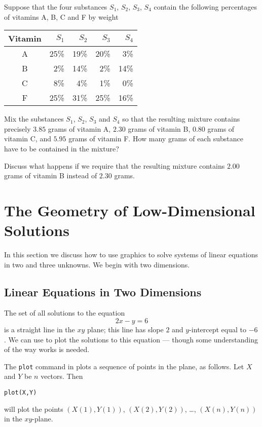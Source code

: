 \documentclass{ximera}
\begin{document}
\begin{exercise} \label{c2.1.7}
Suppose that the four substances $S_1$, $S_2$, $S_3$, $S_4$
contain the following percentages of vitamins A, B, C and F by
weight
\begin{center}
\begin{tabular}{|c||r|r|r|r|}
\hline
Vitamin   & $S_1$ & $S_2$ & $S_3$ & $S_4$\\
\hline
 A & 25\% &    19\% &    20\% &    3\% \\
 B &  2\% &    14\% &     2\% &   14\% \\
 C &  8\% &     4\% &     1\% &     0\% \\
 F & 25\% &    31\% &    25\% &    16\% \\
\hline
\end{tabular}
\end{center}
Mix the substances $S_1$, $S_2$, $S_3$ and $S_4$ so that the
resulting mixture contains precisely $3.85$ grams of vitamin A,
$2.30$ grams of vitamin B, $0.80$ grams of vitamin C, and $5.95$
grams of vitamin F.  How many grams of each substance have to be
contained in the mixture?

Discuss what happens if we require that the resulting mixture contains
$2.00$ grams of vitamin B instead of $2.30$ grams.
\end{exercise}



\section{The Geometry of Low-Dimensional Solutions}
\label{S:2.2}

In this section we discuss how to use \Matlab graphics to solve
systems of linear equations in two and three unknowns.  We begin
with two dimensions.

\subsection*{Linear Equations in Two Dimensions}

The set of all solutions to the equation
\begin{equation} \label{2x-y=6}
2x - y = 6
\end{equation}
is a straight line in the $xy$ plane; this line
has slope $2$ and $y$-intercept equal to $-6$.  We can use
\Matlab to plot the solutions to this equation --- though some
understanding of the way \Matlab works is needed.

The {\tt plot} command in \Matlab plots a sequence of points in
the plane, as follows.  Let $X$ and $Y$ be $n$ vectors. Then
\begin{verbatim}
plot(X,Y)
\end{verbatim} 
will plot the points $(X(1),Y(1))$, $(X(2),Y(2))$, \ldots,
$(X(n),Y(n))$ in the $xy$-plane.  
\end{document}
